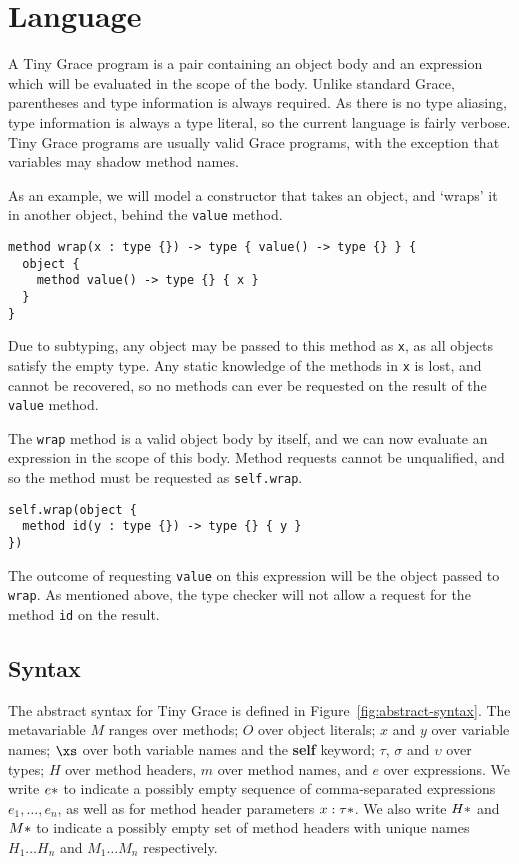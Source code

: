 \section{Language}\label{sec:language}

A Tiny Grace program is a pair containing an object body and an expression which
will be evaluated in the scope of the body. Unlike standard Grace, parentheses
and type information is always required. As there is no type aliasing, type
information is always a type literal, so the current language is fairly verbose.
Tiny Grace programs are usually valid Grace programs, with the exception that
variables may shadow method names.

As an example, we will model a constructor that takes an object, and `wraps' it
in another object, behind the \lstinline{value} method.

\begin{lstlisting}
method wrap(x : type {}) -> type { value() -> type {} } {
  object {
    method value() -> type {} { x }
  }
}
\end{lstlisting}

\noindent Due to subtyping, any object may be passed to this method as
\lstinline{x}, as all objects satisfy the empty type. Any static knowledge of
the methods in \lstinline{x} is lost, and cannot be recovered, so no methods can
ever be requested on the result of the \lstinline{value} method.

The \lstinline{wrap} method is a valid object body by itself, and we can now
evaluate an expression in the scope of this body. Method requests cannot be
unqualified, and so the method must be requested as \lstinline{self.wrap}.

\begin{lstlisting}
self.wrap(object {
  method id(y : type {}) -> type {} { y }
})
\end{lstlisting}

\noindent The outcome of requesting \lstinline{value} on this expression will be
the object passed to \lstinline{wrap}. As mentioned above, the type checker will
not allow a request for the method \lstinline{id} on the result.

\subsection{Syntax}\label{sec:syntax}

The abstract syntax for Tiny Grace is defined in
Figure~\ref{fig:abstract-syntax}. The metavariable $M$ ranges over methods;
$O$ over object literals; $x$ and $y$ over variable names; $\xs$ over both
variable names and the {\sffamily\bfseries self} keyword; $\tau$, $\sigma$ and
$\upsilon$ over types; $H$ over method headers, $m$ over method names, and $e$
over expressions. We write $\*e*$ to indicate a possibly empty sequence of
comma-separated expressions $e_1, \dots, e_n$, as well as for method header
parameters $\*x : \tau*$. We also write $\*H*$ and $\*M*$ to indicate a
possibly empty set of method headers with unique names $H_1 \dots H_n$ and
$M_1 \dots M_n$ respectively.


